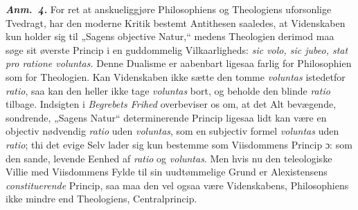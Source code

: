 \documentclass[12pt]{book}
\newcommand{\anm}[1]{\emph{\textbf{Anm.~#1.}}}
\newcommand{\dsi}{\textup{ɔ:}}
\newcommand{\opage}[1]{\marginnote{\footnotesize\textit{[#1]}}}
\begin{document}
\anm{4} For ret at anskueliggjøre Philosophiens og Theologiens uforsonlige Tvedragt,
har den moderne Kritik bestemt Antithesen saaledes, at Videnskaben kun holder sig til
„Sagens objective Natur,“ medens Theologien derimod maa søge sit øverste Princip i en
guddommelig Vilkaarligheds: \textit{sic volo, sic jubeo, stat pro ratione voluntas.}
Denne Dualisme er aabenbart ligesaa farlig for Philosophien som for Theologien. Kan
Videnskaben ikke sætte den tomme \textit{voluntas} istedetfor \textit{ratio}, saa kan
den heller ikke tage \textit{voluntas} bort, og beholde den blinde \textit{ratio}
tilbage. Indsigten i \emph{Begrebets Frihed} overbeviser os om, at det Alt bevægende,
sondrende, „Sagens Natur“ determinerende Princip ligesaa lidt kan være en objectiv
nødvendig \textit{ratio} uden \textit{voluntas}, som en subjectiv formel
\textit{voluntas} uden \textit{ratio}; thi det evige Selv lader sig kun bestemme som
Viisdommens Princip \dsi{} som den sande, levende Eenhed af \textit{ratio} og
\textit{voluntas}. Men hvis nu den teleologiske Villie med Viisdommens Fylde
\opage{268} til sin uudtømmelige Grund er Alexistensens \textit{constituerende} Princip, saa maa
den vel ogsaa være Videnskabens, Philosophiens ikke mindre end Theologiens,
Centralprincip.
\end{document}
